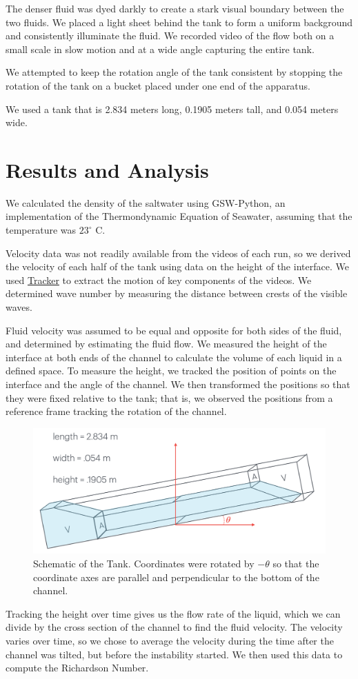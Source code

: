 \documentclass{article}
\begin{document}
The denser fluid was dyed darkly to create a stark visual boundary between the
two fluids. We placed a light sheet behind the tank to form a uniform background
and consistently illuminate the fluid. We recorded video of the flow both on a
small scale in slow motion and at a wide angle capturing the entire tank.

We attempted to keep the rotation angle of the tank consistent by stopping the
rotation of the tank on a bucket placed under one end of the apparatus.

We used a tank that is 2.834 meters long, 0.1905 meters tall, and 0.054 meters
wide.

\section{Results and Analysis}

We calculated the density of the saltwater using GSW-Python, an implementation of the Thermondynamic Equation of Seawater, assuming that the temperature was \(23^\circ\) C.


Velocity data was not readily available from the videos of each run, so we
derived the velocity of each half of the tank using data on the height of the
interface. We used \href{https://physlets.org/tracker/}{Tracker} to extract the
motion of key components of the videos. We determined wave number by measuring
the distance between crests of the visible waves.

Fluid velocity was assumed to be equal and opposite for both sides of the fluid,
and determined by estimating the fluid flow. We measured the height of the
interface at both ends of the channel to calculate the volume of each liquid in
a defined space. To measure the height, we tracked the position of points on the
interface and the angle of the channel. We then transformed the positions so
that they were fixed relative to the tank; that is, we observed the positions
from a reference frame tracking the rotation of the channel.
\begin{figure}[h]
    \centering
    \includegraphics[width=5in]{tank-schematic.png}
    \caption{Schematic of the Tank. Coordinates were rotated by $-\theta$ so that the coordinate axes are parallel and perpendicular to the bottom of the channel.}
    \label{img:tank-schematic}
\end{figure}
Tracking the height over time gives us the flow rate of the liquid, which we can
divide by the cross section of the channel to find the fluid velocity. The
velocity varies over time, so we chose to average the velocity during the time
after the channel was tilted, but before the instability started. We then used
this data to compute the Richardson Number.
\end{document}
